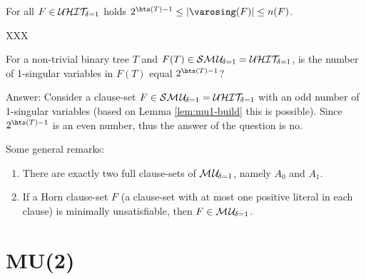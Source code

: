 \documentclass{article}
\begin{document}
\begin{lem}\label{lem:mu1-1sing-cnt}
For all $F \in \mathcal{U}\mathcal{HIT}_{\!\!\delta=1}$ holds $2^{\hts(T)-1} \le \abs{\varosing(F)} \le n(F)$.
\end{lem}                                                                              
\begin{prf}
XXX
\end{prf}  
                                                                                                                                                              
                                                                                                                                                                                                                                                                                                                                                                                                                                                                                        
                                                                                                                                                                                                                                                                                                                            
\begin{quest}\label{que:hitnum}
For a non-trivial binary tree $T$ and $F(T) \in \mathcal{S}\mathcal{M\hspace{0.8pt}U}_{\!\delta=1}=\mathcal{U}\mathcal{HIT}_{\!\!\delta=1}$, is the number of 1-singular variables in $F(T)$ equal $2^{\hts(T)-1}$?

Answer: Consider a clause-set $F \in \mathcal{S}\mathcal{M\hspace{0.8pt}U}_{\!\delta=1}=\mathcal{U}\mathcal{HIT}_{\!\!\delta=1}$ with an odd number of 1-singular variables (based on Lemma \ref{lem:mu1-build} this is possible). Since $2^{\hts(T)-1}$ is an even number, thus the answer of the question is no.
\end{quest}


Some general remarks: 
  \begin{enumerate}
  \item There are exactly two full clause-sets of $\mathcal{M\hspace{0.8pt}U}_{\!\delta=1}$, namely $A_0$ and $A_1$.
  \item If a Horn clause-set $F$ (a clause-set with at most one positive literal in each clause) is minimally unsatisfiable, then $F \in \mathcal{M\hspace{0.8pt}U}_{\!\delta=1}$.
  \end{enumerate}  
\section{MU(2)}
\label{sec:mu2}
\end{document}
